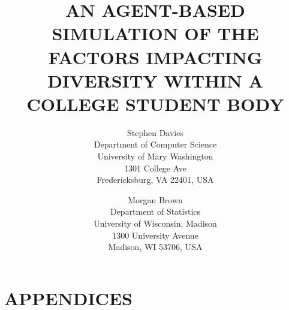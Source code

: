 \documentclass{wscpaperproc}
\begin{document}

\title{AN AGENT-BASED SIMULATION OF THE FACTORS IMPACTING \\DIVERSITY WITHIN A
COLLEGE STUDENT BODY}

\author{Stephen Davies\\ [12pt]
Department of Computer Science \\
University of Mary Washington\\
1301 College Ave \\
Fredericksburg, VA 22401, USA
\and
Morgan Brown\\[12pt]
Department of Statistics \\
University of Wisconsin, Madison\\
1300 University Avenue\\
Madison, WI 53706, USA \\
}

\maketitle









\appendix

\section{APPENDICES}

\vspace{6pt}





\end{document}

